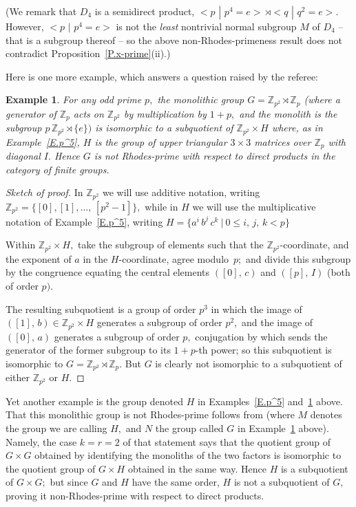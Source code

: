 \documentclass{amsart}
\newtheorem{example}[theorem]{Example}
\numberwithin{equation}{section}
\numberwithin{theorem}{section}
\newcommand{\Z}{\mathbb{Z}}
\begin{document}
(We remark that $D_4$ is a semidirect
product, $<\!p\,\,|\,\,p^4=e\!>\,\rtimes<\!q\,\,|\,\,q^2=e\!>\!.$
However, $<\!p\,\,|\,\,p^4=e\!>$ is not the {\em least}
nontrivial normal subgroup $M$ of $D_4$ -- that is a subgroup
thereof -- so the above non-Rhodes-primeness result
does not contradict Proposition~\ref{P.x-prime}(ii).)

Here is one more example, which answers
a question raised by the referee:

\begin{example}\label{E.ZpZp^2}
For any odd prime $p,$ the monolithic group $G=\Z_{p^2}\rtimes\Z_p$
{\rm(}where a generator of $\Z_p$ acts on $\Z_{p^2}$ by
multiplication by $1\!+\!p,$ and the monolith is
the subgroup $p\,\Z_{p^2}\rtimes\{e\})$
is isomorphic to a subquotient of $\Z_{p^2}\times H$
where, as in Example~\ref{E.p^5}, $H$ is the group of upper triangular
$3\times 3$ matrices over $\Z_p$ with diagonal $I.$
Hence $G$ is not Rhodes-prime with respect to direct products
in the category of finite groups.
\end{example}

\begin{proof}[Sketch of proof]
In $\Z_{p^2}$ we will use additive notation,
writing $\Z_{p^2}=\{[0],[1],\dots,\,[p^2{-}1]\},$ while in $H$ we will
use the multiplicative notation of Example~\ref{E.p^5},
writing $H=\{a^i\,b^j\,c^k\ |\ 0\leq i,\,j,\,k <p\}$

Within $\Z_{p^2}\times H,$ take the subgroup of elements
such that the $\!\Z_{p^2}\!$-coordinate, and the exponent
of $a$ in the $\!H\!$-coordinate, agree modulo~$p;$
and divide this subgroup by the congruence equating the central
elements $([0],\,c)$ and $([p],\,I)$ (both of order $p).$

The resulting subquotient is a group of order $p^3$ in which the
image of $([1],\,b)\in\Z_{p^2}\times H$ generates
a subgroup of order $p^2,$ and the image of $([0],\,a)$
generates a subgroup of order $p,$ conjugation by which sends
the generator of the former subgroup to
its $\!1{+}p$-th power; so this subquotient is isomorphic to
$G=\Z_{p^2}\rtimes\Z_p.$
But $G$ is clearly not isomorphic to a subquotient
of either $\Z_{p^2}$ or $H.$
\end{proof}

Yet another example is the group denoted $H$ in
Examples~\ref{E.p^5} and~\ref{E.ZpZp^2} above.
That this monolithic group is not Rhodes-prime follows from
\cite[Theorem~5.2\,(ii), p.\,204]{DG}
(where $M$ denotes the group we are calling
$H,$ and $N$ the group called $G$ in Example~\ref{E.ZpZp^2} above).
Namely, the case $k=r=2$ of that statement says that the quotient
group of $G\times G$ obtained by identifying the monoliths
of the two factors is isomorphic to
the quotient group of $G\times H$ obtained in the same way.
Hence $H$ is a subquotient of $G\times G;$
but since $G$ and $H$ have the same order, $H$ is not
a subquotient of $G,$ proving it non-Rhodes-prime with
respect to direct products.
\end{document}
